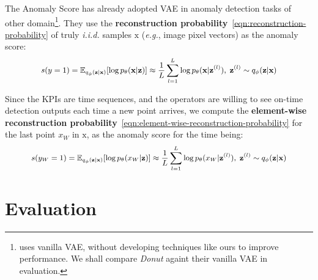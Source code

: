 \documentclass[usenames,dvipsnames]{beamer}
\newcommand{\EG}{\textit{e.g.}}
\newcommand{\DONUT}{\textit{Donut}}
\newcommand{\emphasis}[1]{\textbf{\textcolor{emphcolor}{#1}}}
\let\originalleft\left
\let\originalright\right
\newcommand{\mleft}{\mathopen{}\mathclose\bgroup\originalleft}
\newcommand{\mright}{\aftergroup\egroup\originalright}
\newcommand{\vv}[1]{\bm{\mathrm{{#1}}}}
\newcommand{\EEE}[2]{\operatorname{\mathbb{E}}_{{#1}}\mleft[{#2}\mright]}
\begin{document}
\begin{frame}{The Anomaly Score}
  \cite{vae-ad} has already adopted VAE in anomaly detection tasks of other domain\footnote{\cite{vae-ad} uses vanilla VAE, without developing techniques like ours to improve performance.  We shall compare \DONUT{} againt their vanilla VAE in evaluation.}.  They use the \emphasis{reconstruction probability}~\eqref{eqn:reconstruction-probability} of truly \textit{i.i.d.} samples $\vv{x}$ (\EG{}, image pixel vectors) as the anomaly score:
  \begin{equation}\small
    s(y=1) = \EEE{q_{\phi}(\vv{z}|\vv{x})}{\log p_{\theta}(\vv{x}|\vv{z})} \approx
      \frac{1}{L} \sum_{l=1}^L \log p_{\theta}(\vv{x}|\vv{z}^{(l)}), \; \vv{z}^{(l)}\sim q_{\phi}(\vv{z}|\vv{x}) \label{eqn:reconstruction-probability}
  \end{equation}

  Since the KPIs are time sequences, and the operators are willing to see on-time detection outputs each time a new point arrives, we compute the \emphasis{element-wise reconstruction probability}~\eqref{eqn:element-wise-reconstruction-probability} for the last point $x_W$ in $\vv{x}$, as the anomaly score for the time being:
  \begin{equation}\small
    s(y_W=1) = \EEE{q_{\phi}(\vv{z}|\vv{x})}{\log p_{\theta}(x_W|\vv{z})} \approx
      \frac{1}{L} \sum_{l=1}^L \log p_{\theta}(x_W|\vv{z}^{(l)}), \; \vv{z}^{(l)}\sim q_{\phi}(\vv{z}|\vv{x}) \label{eqn:element-wise-reconstruction-probability}
  \end{equation}
  
\end{frame}



\section{Evaluation}
\end{document}
